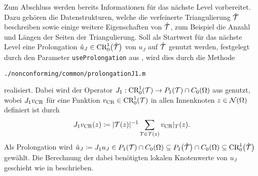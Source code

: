 Zum Abschluss werden bereits Informationen für das nächste Level vorbereitet. 
Dazu gehören die Datenstrukturen, welche die verfeinerte Triangulierung
$\hat{\mathcal{T}}$ beschreiben sowie einige weitere Eigenschaften von
$\hat{\mathcal{T}}$, zum Beispiel die Anzahl und Längen der Seiten der Triangulierung.
Soll als Startwert für das nächste Level eine Prolongation $\hat
u_J\in\textup{CR}^1_0\big(\hat{\mathcal{T}}\big)$ von $u_J$ auf $\hat{\mathcal{T}}$ genutzt werden,
festgelegt durch den Parameter \texttt{useProlongation} aus
, wird dies durch die Methode
\begin{center}
  \texttt{./nonconforming/common/prolongationJ1.m}
\end{center}
realisiert. 
Dabei wird der Operator $J_1:\textup{CR}^1_0(\mathcal{T})\to P_1(\mathcal{T})\cap C_0(\Omega)$ 
aus \cite[1065]{CGS15} genutzt, wobei $J_1v_\textup{CR}$ für eine Funktion $v_\textup{CR}\in\textup{CR}^1_0(\mathcal{T})$ 
in allen Innenknoten $z\in\mathcal{N}(\Omega)$ definiert ist durch
\begin{align*}
  J_1v_\textup{CR}(z)\coloneqq |\mathcal{T}(z)|^{-1}\sum_{T\in\mathcal{T}(z)}v_\textup{CR}|_T(z).
\end{align*}
Als Prolongation wird $\hat u_J\coloneqq J_1 u_J\in P_1(\mathcal{T})\cap
C_0(\Omega)\subseteq P_1\big(\hat{\mathcal{T}}\big)\cap C_0(\Omega)
\subseteq \textup{CR}^1_0\big(\hat{\mathcal{T}}\big)$
gewählt.
Die Berechnung der dabei benötigten lokalen Knotenwerte von $u_J$ geschieht
wie in  beschrieben.

